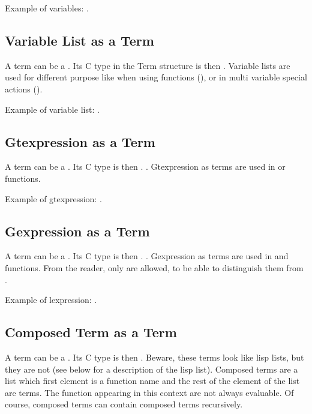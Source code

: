 Example of variables: .

\subsection{Variable List as a Term}

A term can be a . Its C type in the Term structure is then
. Variable lists are used for different purpose like when using
 functions (), or in
multi variable special actions ().

Example of variable list: .

\subsection{Gtexpression as a Term}

A term can be a . Its C type is then .
. Gtexpression as terms are used in
 or  functions.

Example of gtexpression: .

\subsection{Gexpression as a Term}

A term can be a . Its C type is then .
. Gexpression as terms are used in  and
 functions.  From the reader, only  are allowed,
to be able to distinguish them from .

Example of lexpression: .

\subsection{Composed Term as a Term}

A term can be a . Its C type is then .
Beware, these terms look like lisp lists, but they are not (see below for a
description of the lisp list). Composed terms are a list which first element is a
function name and the rest of the element of the list are terms. The function
appearing in this context are not always evaluable. Of course, composed terms
can contain composed terms recursively.

